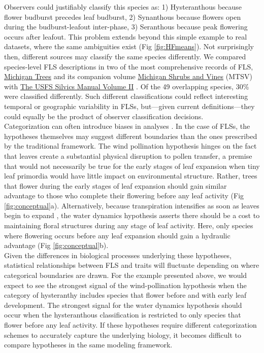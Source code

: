 \documentclass[11pt]{article}
\begin{document}
\noindent Observers could justifiably classify this species as: 1) Hysteranthous because flower budburst precedes leaf budburst, 2) Synanthous because flowers open during the budburst-leafout inter-phase, 3) Seranthous because peak flowering occurs after leafout. This problem extends beyond this simple example to real datasets, \citep[e.g.][]{OKeefe2015} where the same ambiguities exist (Fig \ref{fig:HFmeans}). Not surprisingly then, different sources may classify the same species differently. We compared species-level FLS descriptions in two of the most comprehensive records of FLS, \underline{Michigan Trees} and its companion volume \underline{Michigan Shrubs and Vines} (MTSV) \citep{Barnes2004,Barnes2016} with \underline{The USFS Silvics Manual Volume II} \citep{Burns1990}. Of the 49 overlapping species, 30\% were classified differently. Such different classifications could reflect interesting temporal or geographic variability in FLSs, but---given current definitions---they could equally be the product of observer classification decisions.\\

\noindent Categorization can often introduce biases in analyses \citep{Royston2006}. In the case of FLSs, the hypotheses themselves may suggest different boundaries than the ones prescribed by the traditional framework. The wind pollination hypothesis hinges on the fact that leaves create a substantial physical disruption to pollen transfer, a premise that would not necessarily be true for the early stages of leaf expansion when tiny leaf primordia would have little impact on environmental structure. Rather, trees that flower during the early stages of leaf expansion should gain similar advantage to those who complete their flowering before any leaf activity (Fig \ref{fig:conceptual}a). Alternatively, because transpiration intensifies as soon as leaves begin to expand \citep{%
Wang2018}, the water dynamics hypothesis asserts there should be a cost to maintaining floral structures during any stage of leaf activity. Here, only species where flowering occurs before any leaf expansion should gain a hydraulic advantage (Fig \ref{fig:conceptual}b).\\ 

\noindent Given the differences in biological processes underlying these hypotheses, statistical relationships between FLS and traits will fluctuate depending on where categorical boundaries are drawn. For the example presented above, we would expect to see the strongest signal of the wind-pollination hypothesis when the category of hysteranthy includes species that flower before and with early leaf development. The strongest signal for the water dynamics hypothesis should occur when the hysteranthous classification is restricted to only species that flower before any leaf activity. If these hypotheses require different categorization schemes to accurately capture the underlying biology, it becomes difficult to compare hypotheses in the same modeling framework.\\
\end{document}
